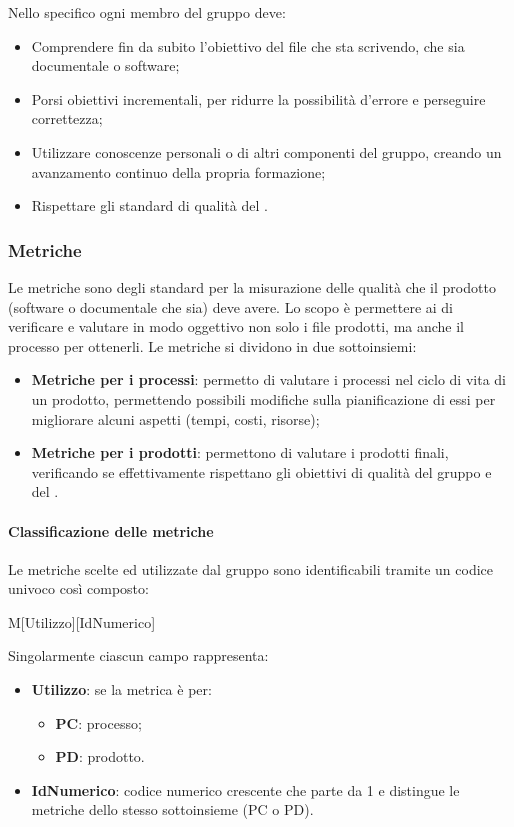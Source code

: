 Nello specifico ogni membro del gruppo deve:
\begin{itemize}
	\item Comprendere fin da subito l'obiettivo del file che sta scrivendo, che sia documentale o software;
	\item Porsi obiettivi incrementali, per ridurre la possibilità d'errore e perseguire correttezza;
	\item Utilizzare conoscenze personali o di altri componenti del gruppo, creando un avanzamento continuo della propria formazione;
	\item Rispettare gli standard di qualità del \PdQv{}.
\end{itemize}

\subsubsection{Metriche}
Le metriche sono degli standard per la misurazione delle qualità che il prodotto (software o documentale che sia) deve avere. Lo scopo è permettere ai  di verificare e valutare in modo oggettivo non solo i file prodotti, ma anche il processo per ottenerli. 
Le metriche si dividono in due sottoinsiemi: 
\begin{itemize}
	\item \textbf{Metriche per i processi}: permetto di valutare i processi nel ciclo di vita di un prodotto, permettendo possibili modifiche sulla pianificazione di essi per migliorare alcuni aspetti (tempi, costi, risorse); 
	\item \textbf{Metriche per i prodotti}: permettono di valutare i prodotti finali, verificando se effettivamente rispettano gli obiettivi di qualità del gruppo e del .
\end{itemize}

\paragraph{Classificazione delle metriche}
Le metriche scelte ed utilizzate dal gruppo sono identificabili tramite un codice univoco così composto: 
\begin{center}
M[Utilizzo][IdNumerico]
\end{center}
Singolarmente ciascun campo rappresenta:
\begin{itemize}
	\item \textbf{Utilizzo}: se la metrica è per:
			\begin{itemize}
				\item \textbf{PC}: processo;
				\item \textbf{PD}: prodotto.
			\end{itemize}
	\item \textbf{IdNumerico}: codice numerico crescente che parte da 1 e distingue le metriche dello stesso sottoinsieme (PC o PD). 
\end{itemize}

